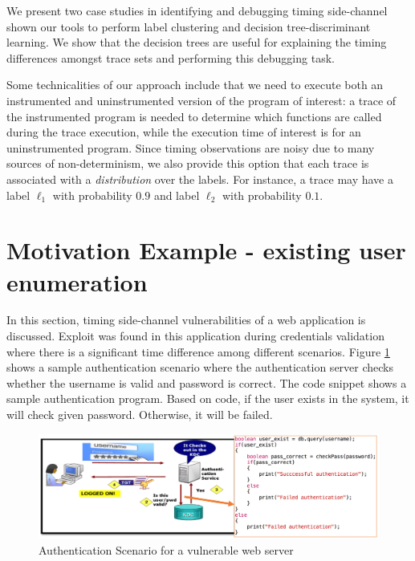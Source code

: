 \documentclass{article}
\begin{document}
We present two case studies in identifying and debugging timing
side-channel shown our tools to
perform label clustering and decision tree-discriminant learning. We show that
the decision trees are useful for explaining the timing
differences amongst trace sets and performing this debugging task.

Some technicalities of our approach include that we need to execute both an
instrumented and uninstrumented version of the program of interest: a trace of
the instrumented program is needed to determine which functions are called during
the trace execution, while the execution time of interest is for an uninstrumented
program. Since timing observations are noisy due to many sources of
non-determinism, we also provide this option that each trace is associated with a
\emph{distribution} over the labels.
For instance, a trace may have a label $\ell_1$ with probability $0.9$
and label $\ell_2$ with probability $0.1$.

\section{Motivation Example - existing user enumeration}
In this section, timing side-channel vulnerabilities of a web application is discussed. 
Exploit was found in this application during credentials validation where there is a significant time difference among different scenarios. Figure \ref{user_enumeration-1} shows a sample
authentication scenario where the authentication server checks whether the username
is valid and password is correct. The code snippet shows a sample authentication program.
Based on code, if the user exists in the system, it will check given password. Otherwise, it
will be failed.  

\begin{figure}[t]
    \centering
    \includegraphics[width=1\textwidth]{User_Enumeration_1}
    \caption{Authentication Scenario for a vulnerable web server}
    \label{user_enumeration-1}
\end{figure}
\end{document}

